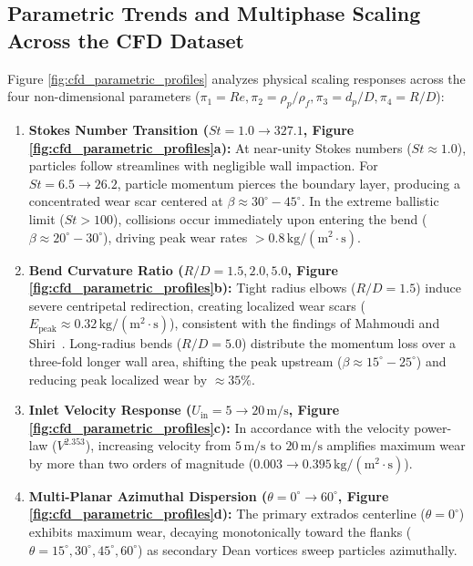 \documentclass{article}
\begin{document}
\subsection{Parametric Trends and Multiphase Scaling Across the CFD Dataset}
Figure \ref{fig:cfd_parametric_profiles} analyzes physical scaling responses across the four non-dimensional parameters ($\pi_1 = Re, \pi_2 = \rho_p/\rho_f, \pi_3 = d_p/D, \pi_4 = R/D$):
\begin{enumerate}
    \item \textbf{Stokes Number Transition ($St = 1.0 \to 327.1$, Figure \ref{fig:cfd_parametric_profiles}a):} At near-unity Stokes numbers ($St \approx 1.0$), particles follow streamlines with negligible wall impaction. For $St = 6.5 \to 26.2$, particle momentum pierces the boundary layer, producing a concentrated wear scar centered at $\beta \approx 30^\circ - 45^\circ$. In the extreme ballistic limit ($St > 100$), collisions occur immediately upon entering the bend ($\beta \approx 20^\circ - 30^\circ$), driving peak wear rates $>0.8\,\mathrm{kg/(m^2\cdot s)}$.
    \item \textbf{Bend Curvature Ratio ($R/D = 1.5, 2.0, 5.0$, Figure \ref{fig:cfd_parametric_profiles}b):} Tight radius elbows ($R/D = 1.5$) induce severe centripetal redirection, creating localized wear scars ($E_{\mathrm{peak}} \approx 0.32\,\mathrm{kg/(m^2\cdot s)}$), consistent with the findings of Mahmoudi and Shiri~\cite{mahmoudi2025erosion}. Long-radius bends ($R/D = 5.0$) distribute the momentum loss over a three-fold longer wall area, shifting the peak upstream ($\beta \approx 15^\circ - 25^\circ$) and reducing peak localized wear by $\approx 35\%$.
    \item \textbf{Inlet Velocity Response ($U_{\mathrm{in}} = 5 \to 20\,\mathrm{m/s}$, Figure \ref{fig:cfd_parametric_profiles}c):} In accordance with the velocity power-law ($V^{2.353}$), increasing velocity from $5\,\mathrm{m/s}$ to $20\,\mathrm{m/s}$ amplifies maximum wear by more than two orders of magnitude ($0.003 \to 0.395\,\mathrm{kg/(m^2\cdot s)}$).
    \item \textbf{Multi-Planar Azimuthal Dispersion ($\theta = 0^\circ \to 60^\circ$, Figure \ref{fig:cfd_parametric_profiles}d):} The primary extrados centerline ($\theta = 0^\circ$) exhibits maximum wear, decaying monotonically toward the flanks ($\theta = 15^\circ, 30^\circ, 45^\circ, 60^\circ$) as secondary Dean vortices sweep particles azimuthally.
\end{enumerate}
\end{document}
